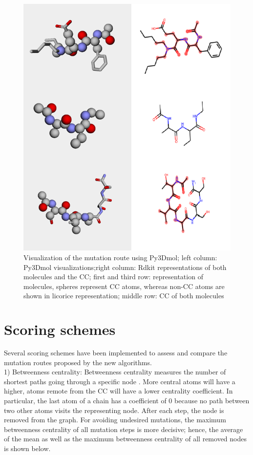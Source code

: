 \begin{figure}
\includegraphics[scale=0.95]{trafo_py3d_2}

\caption{Visualization of the mutation route using Py3Dmol; left column: Py3Dmol visualizations;right column: Rdkit representations of both molecules and the CC; first and third row:  representation of molecules, spheres represent CC atoms, whereas non-CC atoms are shown in licorice representation; middle row: CC of both molecules
}
\label{fig:py3dmol}
\end{figure}


\section{Scoring schemes}

Several scoring schemes have been implemented to assess and compare
the mutation routes proposed by the new algorithms.\\
1) Betweenness centrality: Betweenness centrality measures the number
of shortest paths going through a specific node \cite{Newman.2010}. More central atoms
will have a higher, atoms remote from
the CC will have a lower centrality coefficient. In particular, the last atom of a chain
has a coefficient of 0 because no path between two other atoms visits
the representing node. After each step, the node is removed from
the graph.
For avoiding undesired mutations, the maximum betweenness centrality
of all mutation steps is more decisive; hence, the average of the mean
as well as the maximum betweenness centrality of all removed nodes
is shown below.

